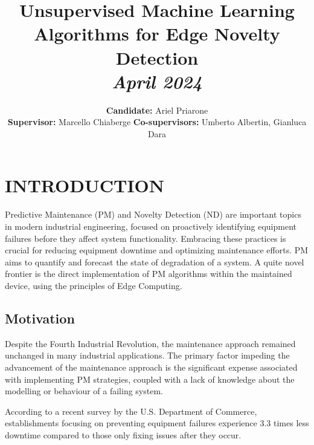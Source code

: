 \documentclass[a4paper, 10pt, conference, oneside]{ieeeconf}
\title{{\LARGE \bf
Unsupervised Machine Learning Algorithms for Edge Novelty Detection} \\ \normalsize \vspace*{5pt} \textit{April 2024}
}
\author{\textbf{Candidate:} Ariel Priarone \\
\textbf{Supervisor:} Marcello Chiaberge 
\textbf{Co-supervisors:} Umberto Albertin, Gianluca Dara}
\date{\vspace{-\baselineskip}}
\begin{document}
\maketitle
\thispagestyle{empty}
\pagestyle{empty}



\section{INTRODUCTION}
\label{sec:introduction}

Predictive Maintenance (PM) and Novelty Detection (ND) are important topics in modern industrial engineering, focused on proactively identifying equipment failures before they affect system functionality. Embracing these practices is crucial for reducing equipment downtime and optimizing maintenance efforts. PM aims to quantify and forecast the state of degradation of a system. A quite novel frontier is the direct implementation of PM algorithms within the maintained device, using the principles of Edge Computing.

\subsection{Motivation}
Despite the Fourth Industrial Revolution, the maintenance approach remained unchanged in many industrial applications. The primary factor impeding the advancement of the maintenance approach is the significant expense associated with implementing PM strategies, coupled with a lack of knowledge about the modelling or behaviour of a failing system.

According to a recent survey by the U.S. Department of Commerce, establishments focusing on preventing equipment failures experience 3.3 times less downtime compared to those only fixing issues after they occur.
\end{document}
